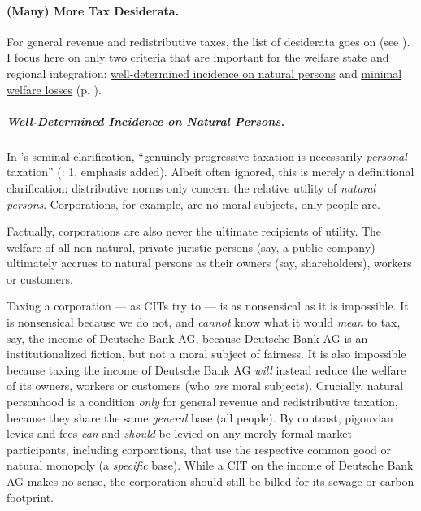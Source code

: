 \paragraph[Tax Desiderata]{(Many) More Tax Desiderata.} For general revenue and redistributive taxes, the list of desiderata goes on (see \citealt{Held2010a}). I focus here on only two criteria that are important for the welfare state and regional integration: \hyperref[sec:well-determinedincidence]{well-determined incidence on natural persons} and \hyperref[sec:minimalDWL]{minimal welfare losses} (p. \pageref{sec:minimalDWL}). 

\subparagraph[Incidence]{Well-Determined Incidence on Natural Persons.} \label{sec:well-determinedincidence} In \citeauthor{Vickrey1947}'s seminal clarification, ``genuinely progressive taxation is necessarily \emph{personal} taxation'' (\citeyear{Vickrey1947}: 1, emphasis added). Albeit often ignored, this is merely a definitional clarification: distributive norms only concern the relative utility of \emph{natural persons}. Corporations, for example, are no moral subjects, only people are. 

Factually, corporations are also never the ultimate recipients of utility. The welfare of all non-natural, private juristic persons (say, a public company) ultimately accrues to natural persons as their owners (say, shareholders), workers or customers. 

Taxing a corporation --- as \glspl{CIT} try to --- is as nonsensical as it is impossible. It is nonsensical because we do not, and \emph{cannot} know what it would \emph{mean} to tax, say, the income of Deutsche Bank AG, because Deutsche Bank AG is an institutionalized fiction, but not a moral subject of fairness. It is also impossible because taxing the income of Deutsche Bank AG \emph{will} instead reduce the welfare of its owners, workers or customers (who \emph{are} moral subjects).
Crucially, natural personhood is a condition \emph{only} for general revenue and redistributive taxation, because they share the same \emph{general} base (all people). By contrast, pigouvian levies and fees \emph{can} and \emph{should} be levied on any merely formal market participants, including corporations, that use the respective common good or natural monopoly (a \emph{specific} base). While a \gls{CIT} on the income of Deutsche Bank AG makes no sense, the corporation should still be billed for its sewage or carbon footprint.

